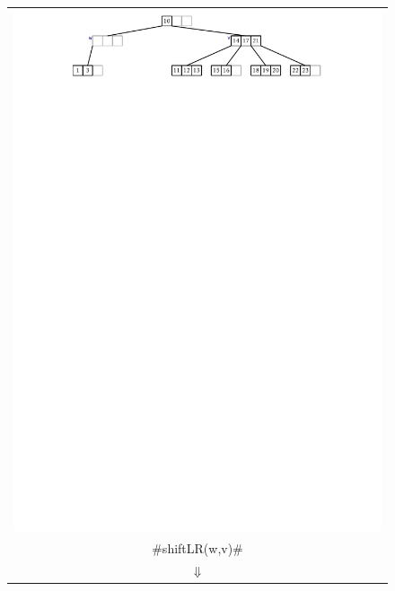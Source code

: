 \begin{figure}
{\begin{tabular}{@{}l@{}}
     \includegraphics[width=\ScaleIfNeeded]{figs/btree-remove-full-3} \\[2ex]
     \multicolumn{1}{c}{#shiftLR(w,v)#} \\
     \multicolumn{1}{c}{$\Downarrow$} \\[2ex]

\end{tabular}}
\end{figure}
